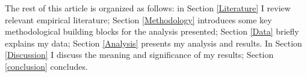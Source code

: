\documentclass[11pt]{article}
\begin{document}





The rest of this article is organized as follows: in Section \ref{Literature} I review relevant empirical literature; Section \ref{Methodology} introduces some key methodological building blocks for the analysis presented; Section \ref{Data} briefly explains my data; Section \ref{Analysis} presents my analysis and results. In Section \ref{Discussion} I discuss the meaning and significance of my results; Section \ref{conclusion} concludes.
\end{document}

